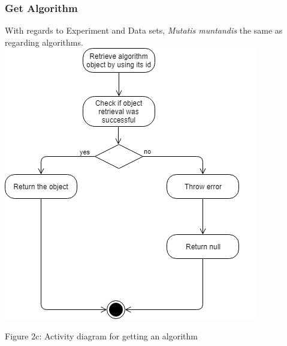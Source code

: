     \subsubsection{Get Algorithm}
    \par With regards to Experiment and Data sets,
{ \textit{Mutatis muntandis} the same as regarding algorithms.} \newline \newline
    \includegraphics[width=\textwidth]{input_unit/images/get_algorithm_activity_diagram.png}
	\begin{center}
	    \small{Figure 2c: Activity diagram for getting an algorithm }
    \end{center}
    
